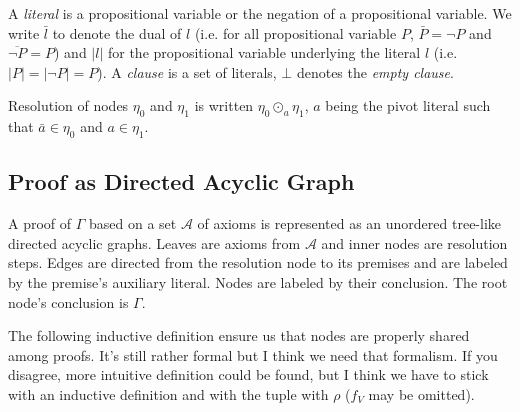 \documentclass{llncs}
\newcommand{\dual}[1]{{\ensuremath{\bar{#1}}}}
\newenvironment{jogo}{\color{teal}}{}
\begin{document}
A \emph{literal} is a propositional variable or the negation of a propositional variable. We write
\dual{l} to denote the dual of $l$ (i.e. for all propositional variable $P$, $\dual{P} =
\neg P$ and $\overline{\neg P} = P$) and $|l|$ for the propositional variable underlying the literal
$l$ (i.e. $|P| = |\neg P| = P$). A \emph{clause} is a set of literals, $\bot$ denotes the
\emph{empty clause}.

\begin{notation}[Resolution]
Resolution of nodes $\eta_0$ and $\eta_1$ is written $\eta_0 \odot_a \eta_1$, $a$ being the pivot
literal such that $\bar{a} \in \eta_0$ and $a \in \eta_1$.
\end{notation}

\subsection{Proof as Directed Acyclic Graph}

A proof of $\Gamma$ based on a set $\mathcal{A}$ of axioms is represented as an unordered tree-like
directed acyclic graphs. Leaves are axioms from $\mathcal{A}$ and inner nodes are resolution steps.
Edges are directed from the resolution node to its premises and are labeled by the premise's
auxiliary literal. Nodes are labeled by their conclusion. The root node's conclusion is $\Gamma$.

\begin{jogo}
The following inductive definition ensure us that nodes are properly shared among proofs. It's still
rather formal but I think we need that formalism. If you disagree, more intuitive definition could
be found, but I think we have to stick with an inductive definition and with the tuple with $\rho$
($f_V$ may be omitted).
\end{jogo}
\end{document}
